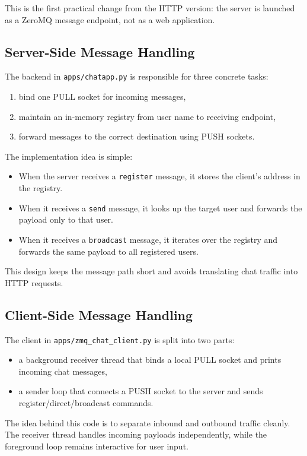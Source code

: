 \documentclass[a4paper,12pt]{article}
\begin{document}
This is the first practical change from the HTTP version: the server is launched as a ZeroMQ message endpoint, not as a web application.

\subsection{Server-Side Message Handling}
The backend in \texttt{apps/chatapp.py} is responsible for three concrete tasks:
\begin{enumerate}[leftmargin=1.4em]
  \item bind one PULL socket for incoming messages,
  \item maintain an in-memory registry from user name to receiving endpoint,
  \item forward messages to the correct destination using PUSH sockets.
\end{enumerate}

The implementation idea is simple:
\begin{itemize}[leftmargin=1.4em]
  \item When the server receives a \texttt{register} message, it stores the client's address in the registry.
  \item When it receives a \texttt{send} message, it looks up the target user and forwards the payload only to that user.
  \item When it receives a \texttt{broadcast} message, it iterates over the registry and forwards the same payload to all registered users.
\end{itemize}

This design keeps the message path short and avoids translating chat traffic into HTTP requests.

\subsection{Client-Side Message Handling}
The client in \texttt{apps/zmq\_chat\_client.py} is split into two parts:
\begin{itemize}[leftmargin=1.4em]
  \item a background receiver thread that binds a local PULL socket and prints incoming chat messages,
  \item a sender loop that connects a PUSH socket to the server and sends register/direct/broadcast commands.
\end{itemize}

The idea behind this code is to separate inbound and outbound traffic cleanly. The receiver thread handles incoming payloads independently, while the foreground loop remains interactive for user input.
\end{document}
